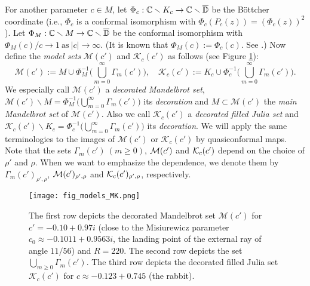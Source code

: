 For another parameter $c \in M$, let 
$\Phi_c : \mathbb C \smallsetminus K_c \to \mathbb C \smallsetminus \overline{\mathbb D}$ be the
B\"ottcher coordinate (i.e., $\Phi_c$ is a conformal isomorphism with 
$\Phi_c(P_c(z)) = (\Phi_c(z))^2$). 
Let $\Phi_M : \mathbb C \smallsetminus M \to \mathbb C \smallsetminus \overline{\mathbb D}$ 
be the conformal isomorphism with 
$\Phi_M(c)/c \to 1 \ \text{as} \ |c| \to \infty$. (It is known that
$\Phi_M(c) := \Phi_c(c)$. See \cite{DH Orsay}.) Now define the {\it model sets} 
$\mathcal{M}(c')$ and $\mathcal{K}_c(c')$
as follows (see Figure \ref{figure of models_MK}):
$$
  \mathcal{M}(c') 
:= M \cup \Phi_M^{-1}\Big( \bigcup_{m=0}^\infty \Gamma_m(c') \Big), \quad
  \mathcal{K}_c(c') 
:= K_c \cup \Phi_c^{-1}\Big( \bigcup_{m=0}^\infty \Gamma_m(c') \Big).
$$
We especially call 
${\mathcal M}(c')$ a {\it decorated Mandelbrot set},
${\mathcal M}(c') \smallsetminus M 
= \Phi_M^{-1}\Big( \bigcup_{m=0}^\infty \Gamma_m(c') \Big)$ its 
{\it decoration} and $M \subset {\mathcal M}(c')$
the {\it main Mandelbrot set} of ${\mathcal M}(c')$. 
Also we call
${\mathcal K}_c(c')$ a {\it decorated filled Julia set} and
${\mathcal K}_c(c') \smallsetminus K_c
= \Phi_c^{-1}\Big( \bigcup_{m=0}^\infty \Gamma_m(c') \Big)$ its 
{\it decoration}. We will apply the same terminologies to the images of 
${\mathcal M}(c')$ or
${\mathcal K}_c(c')$ by 
quasiconformal maps.
Note that the sets 
$\Gamma_m(c')~(m \ge 0)$,
${\mathcal{M}}(c')$ and 
${\mathcal{K}}_{c}(c')$
depend on the choice of $\rho'$ and $\rho$.
When we want to
emphasize the dependence,
we denote them by 
$\Gamma_m(c')_{\rho', \rho}$, 
${\mathcal{M}}(c')_{\rho', \rho}$ and
${\mathcal{K}}_{c}(c')_{\rho', \rho}$, 
respectively. 



\begin{figure}[htbp]

\texttt{[image: fig\_models\_MK.png]}
\caption{\small 
The first row depicts the decorated Mandelbrot set
$\mathcal{M}(c')$ for $c'= -0.10 + 0.97i$
(close to the Misiurewicz parameter $c_0 \approx -0.1011+0.9563i$,
the landing point of the external ray of angle $11/56$)
and $R=220$.
The second row depicts the set $\bigcup_{m \ge 0} \Gamma_m(c')$.
The third row depicts the decorated filled Julia set
$\mathcal{K}_c(c')$ for $c \approx -0.123+0.745$ (the rabbit).
}
\label{figure of models_MK}
\end{figure}







